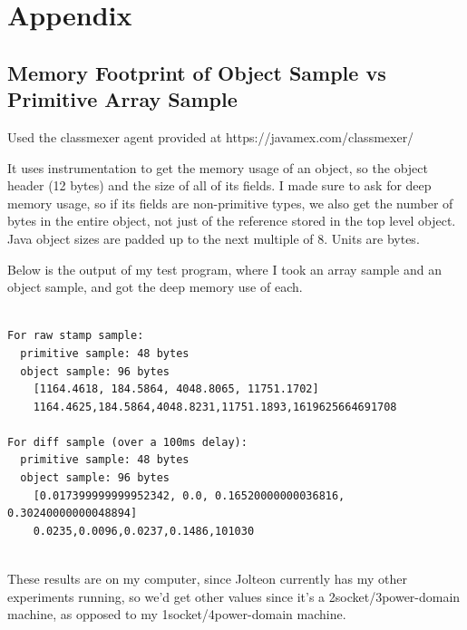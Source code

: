 \section{Appendix}


\subsection{Memory Footprint of Object Sample vs Primitive Array Sample}

Used the classmexer agent provided at https://javamex.com/classmexer/

It uses instrumentation to get the memory usage of an object, so the object header
(12 bytes) and the size of all of its fields. I made sure to ask for deep memory
usage, so if its fields are non-primitive types, we also get the number of bytes
in the entire object, not just of the reference stored in the top level object. Java
object sizes are padded up to the next multiple of 8. Units are bytes.

Below is the output of my test program, where I took an array sample and an object
sample, and got the deep memory use of each.
\begin{verbatim}

For raw stamp sample:
  primitive sample: 48 bytes
  object sample: 96 bytes
    [1164.4618, 184.5864, 4048.8065, 11751.1702]
    1164.4625,184.5864,4048.8231,11751.1893,1619625664691708

For diff sample (over a 100ms delay):
  primitive sample: 48 bytes
  object sample: 96 bytes
    [0.017399999999952342, 0.0, 0.16520000000036816, 0.30240000000048894]
    0.0235,0.0096,0.0237,0.1486,101030
    
\end{verbatim}

These results are on my computer, since Jolteon currently has my other experiments
running, so we'd get other values since it's a 2socket/3power-domain machine, as opposed to my 1socket/4power-domain machine.

